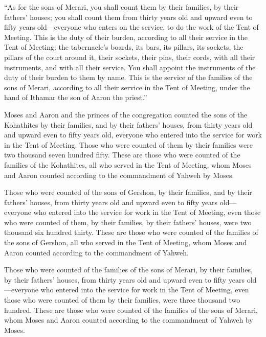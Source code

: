  ``As for the sons of Merari, you shall count them by
their families, by their fathers' houses;  you shall
count them from thirty years old and upward even to fifty years
old---everyone who enters on the service, to do the work of the Tent of
Meeting.  This is the duty of their burden, according to
all their service in the Tent of Meeting: the tabernacle's boards, its
bars, its pillars, its sockets,  the pillars of the court
around it, their sockets, their pins, their cords, with all their
instruments, and with all their service. You shall appoint the
instruments of the duty of their burden to them by name. 
This is the service of the families of the sons of Merari, according to
all their service in the Tent of Meeting, under the hand of Ithamar the
son of Aaron the priest.''

 Moses and Aaron and the princes of the congregation
counted the sons of the Kohathites by their families, and by their
fathers' houses,  from thirty years old and upward even
to fifty years old, everyone who entered into the service for work in
the Tent of Meeting.  Those who were counted of them by
their families were two thousand seven hundred fifty. 
These are those who were counted of the families of the Kohathites, all
who served in the Tent of Meeting, whom Moses and Aaron counted
according to the commandment of Yahweh by Moses.

 Those who were counted of the sons of Gershon, by their
families, and by their fathers' houses,  from thirty
years old and upward even to fifty years old---everyone who entered into
the service for work in the Tent of Meeting,  even those
who were counted of them, by their families, by their fathers' houses,
were two thousand six hundred thirty.  These are those
who were counted of the families of the sons of Gershon, all who served
in the Tent of Meeting, whom Moses and Aaron counted according to the
commandment of Yahweh.

 Those who were counted of the families of the sons of
Merari, by their families, by their fathers' houses, 
from thirty years old and upward even to fifty years old---everyone who
entered into the service for work in the Tent of Meeting,
 even those who were counted of them by their families,
were three thousand two hundred.  These are those who
were counted of the families of the sons of Merari, whom Moses and Aaron
counted according to the commandment of Yahweh by Moses.

